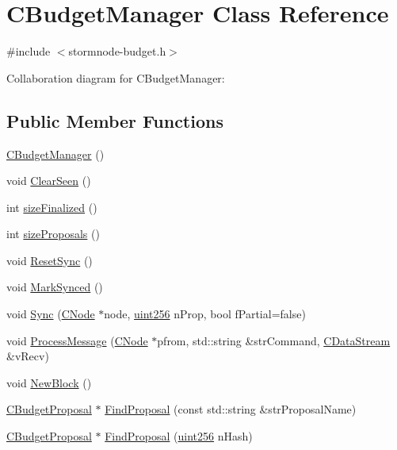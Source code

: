 \hypertarget{class_c_budget_manager}{}\section{C\+Budget\+Manager Class Reference}
\label{class_c_budget_manager}


{\ttfamily \#include $<$stormnode-\/budget.\+h$>$}



Collaboration diagram for C\+Budget\+Manager\+:
\subsection*{Public Member Functions}
\begin{DoxyCompactItemize}
\item 
\hyperlink{class_c_budget_manager_a6915e87870564c284338fcdd641747ea}{C\+Budget\+Manager} ()
\item 
void \hyperlink{class_c_budget_manager_a21781707dcbe751e196abc105b51a669}{Clear\+Seen} ()
\item 
int \hyperlink{class_c_budget_manager_ad5cbfb683ac7357fae4a68a7f3b665d9}{size\+Finalized} ()
\item 
int \hyperlink{class_c_budget_manager_a609ccf2a42e5143ddcc6c5d52a9a8afb}{size\+Proposals} ()
\item 
void \hyperlink{class_c_budget_manager_ac890f5fcc4bb9ec568675d602595d384}{Reset\+Sync} ()
\item 
void \hyperlink{class_c_budget_manager_a4734e3b02666531b008329e84391757d}{Mark\+Synced} ()
\item 
void \hyperlink{class_c_budget_manager_ab24ec088c09d18c03ae539f2bbe19743}{Sync} (\hyperlink{class_c_node}{C\+Node} $\ast$node, \hyperlink{classuint256}{uint256} n\+Prop, bool f\+Partial=false)
\item 
void \hyperlink{class_c_budget_manager_a3fc235d528e37ec1c66789f3bfed1878}{Process\+Message} (\hyperlink{class_c_node}{C\+Node} $\ast$pfrom, std\+::string \&str\+Command, \hyperlink{class_c_data_stream}{C\+Data\+Stream} \&v\+Recv)
\item 
void \hyperlink{class_c_budget_manager_a9c62c8f18b6f101465415952349ce203}{New\+Block} ()
\item 
\hyperlink{class_c_budget_proposal}{C\+Budget\+Proposal} $\ast$ \hyperlink{class_c_budget_manager_a185f3408172582919cf072835e716373}{Find\+Proposal} (const std\+::string \&str\+Proposal\+Name)
\item 
\hyperlink{class_c_budget_proposal}{C\+Budget\+Proposal} $\ast$ \hyperlink{class_c_budget_manager_a239d05bfaeb5ec1309134aac3be316ec}{Find\+Proposal} (\hyperlink{classuint256}{uint256} n\+Hash)

\end{DoxyCompactItemize}
